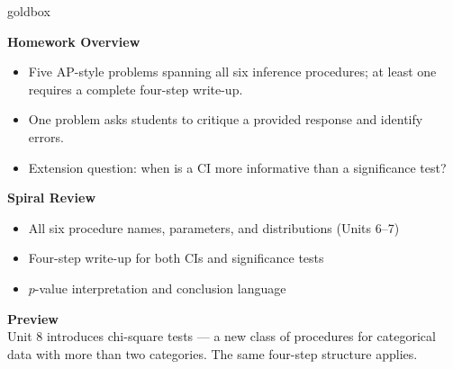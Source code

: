 \documentclass[10pt]{article}
\begin{document}
\begin{skillbox}{goldbox}
\begin{minipage}[t]{0.48\linewidth}
    \textbf{Homework Overview}
    \begin{itemize}
        \item Five AP-style problems spanning all six inference procedures; at least one
              requires a complete four-step write-up.
        \item One problem asks students to critique a provided response and identify errors.
        \item Extension question: when is a CI more informative than a significance test?
    \end{itemize}
\end{minipage}
\hfill
\begin{minipage}[t]{0.48\linewidth}
    \textbf{Spiral Review}
    \begin{itemize}
        \item All six procedure names, parameters, and distributions (Units 6--7)
        \item Four-step write-up for both CIs and significance tests
        \item $p$-value interpretation and conclusion language
    \end{itemize}
    \textbf{Preview}\\
    Unit 8 introduces chi-square tests --- a new class of procedures for categorical data
    with more than two categories. The same four-step structure applies.
\end{minipage}
\end{skillbox}
\end{document}
